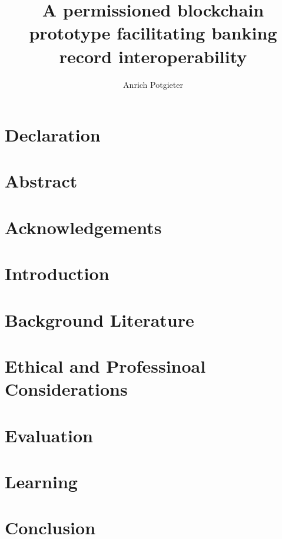 \documentclass[12pt]{report}
\title{A permissioned blockchain prototype facilitating banking record interoperability}
\author{Anrich Potgieter}
\begin{document}
    
    \maketitle

    \tableofcontents
    
    \section*{Declaration}

    \section*{Abstract}

    \section*{Acknowledgements}

    \section{Introduction}

    \section{Background Literature}

    \section{Ethical and Professinoal Considerations}

    \section{Evaluation}

    \section{Learning}

    \section{Conclusion}

    \printbibliography

    \appendix
\end{document}
